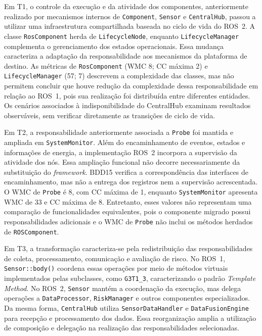 Em T1, o controle da execução e da atividade dos componentes, anteriormente realizado por mecanismos internos de \texttt{Component}, \texttt{Sensor} e \texttt{CentralHub}, passou a utilizar uma infraestrutura compartilhada baseada no ciclo de vida do ROS~2. A classe \texttt{RosComponent} herda de \texttt{LifecycleNode}, enquanto \texttt{LifecycleManager} complementa o gerenciamento dos estados operacionais. Essa mudança caracteriza a adaptação da responsabilidade aos mecanismos da plataforma de destino. As métricas de \texttt{RosComponent} (WMC 8; CC máxima 2) e \texttt{LifecycleManager} (57; 7) descrevem a complexidade das classes, mas não permitem concluir que houve redução da complexidade dessa responsabilidade em relação ao ROS~1, pois sua realização foi distribuída entre diferentes entidades. Os cenários associados à indisponibilidade do CentralHub examinam resultados observáveis, sem verificar diretamente as transições de ciclo de vida.

Em T2, a responsabilidade anteriormente associada a \texttt{Probe} foi mantida e ampliada em \texttt{SystemMonitor}. Além do encaminhamento de eventos, estados e informações de energia, a implementação ROS~2 incorpora a supervisão da atividade dos nós. Essa ampliação funcional não decorre necessariamente da substituição do \textit{framework}. BDD15 verifica a correspondência das interfaces de encaminhamento, mas não a entrega dos registros nem a supervisão acrescentada. O WMC de \texttt{Probe} é 8, com CC máxima de 1, enquanto \texttt{SystemMonitor} apresenta WMC de 33 e CC máxima de 8. Entretanto, esses valores não representam uma comparação de funcionalidades equivalentes, pois o componente migrado possui responsabilidades adicionais e o WMC de \texttt{Probe} não inclui os métodos herdados de \texttt{ROSComponent}.

Em T3, a transformação caracteriza-se pela redistribuição das responsabilidades de coleta, processamento, comunicação e avaliação de risco. No ROS~1, \texttt{Sensor::body()} coordena essas operações por meio de métodos virtuais implementados pelas subclasses, como \texttt{G3T1\_3}, caracterizando o padrão \textit{Template Method}. No ROS~2, \texttt{Sensor} mantém a coordenação da execução, mas delega operações a \texttt{DataProcessor}, \texttt{RiskManager} e outros componentes especializados. Da mesma forma, \texttt{CentralHub} utiliza \texttt{SensorDataHandler} e \texttt{DataFusionEngine} para recepção e processamento dos dados. Essa reorganização amplia a utilização de composição e delegação na realização das responsabilidades selecionadas.


